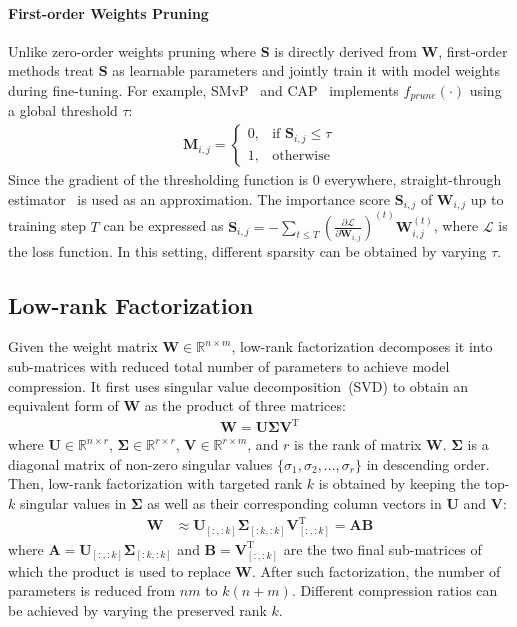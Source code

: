 \paragraph{First-order Weights Pruning} Unlike zero-order weights pruning where $\bm{S}$ is directly derived from $\bm{W}$, first-order methods treat 
$\bm{S}$ as learnable parameters and jointly train it with model weights 
during fine-tuning. For example, SMvP~\cite{movement} and CAP~\cite{cap}
implements $f_{prune}(\cdot)$ using a global threshold $\tau$:
\begin{align}
	\bm{M}_{i,j}=
	\begin{cases} 
		0, & \text{if }\bm{S}_{i,j}\le \tau\\
		1,  & \text{otherwise}  
	\end{cases}
	\label{eq:first}
\end{align}
Since the gradient of the thresholding function is 0 everywhere, straight-through estimator~\cite{st} is used as an approximation. The importance score $\bm{S}_{i,j}$ of $\bm{W}_{i,j}$ up to training step $T$ can be expressed as $\bm{S}_{i,j}=-\sum_{t\le T}(\frac{\partial \mathcal{L}}{\partial \bm{W}_{i,j}})^{(t)} \bm{W}_{i,j}^{(t)}$, where $\mathcal{L}$ is the loss function.
In this setting, different sparsity can be obtained by varying $\tau$.


\subsection{Low-rank Factorization}
\label{sec:lr}
Given the weight matrix $\bm{W}\in \mathbb{R}^{n\times m}$, low-rank factorization decomposes it into sub-matrices with reduced total number of
parameters to achieve model compression.  
It first uses singular value decomposition~(SVD) to obtain an equivalent 
form of $\bm{W}$ as the product of three matrices:
\begin{align}
	\bm{W}=\bm{U}\bm{\Sigma}\bm{V}^\mathrm{T}
\end{align}
where $\bm{U}\in \mathbb{R}^{n\times r}$, $\bm{\Sigma}\in  \mathbb{R}^{r\times r}$, $\bm{V}\in \mathbb{R}^{r\times m}$, and $r$ is the rank of matrix $\bm{W}$. $\bm{\Sigma}$ is a diagonal matrix of non-zero singular values $\{\sigma_1, \sigma_2,...,\sigma_r\}$ in descending order. Then, low-rank factorization with targeted rank $k$ is obtained by keeping the top-$k$ singular values in $\bm{\Sigma}$ as well as their corresponding column vectors in $\bm{U}$ and $\bm{V}$:
\begin{align}
	\bm{W}&\approx \bm{U}_{[:, :k]}\bm{\Sigma}_{[:k,:k]}\bm{V}_{[:, :k]}^{\mathrm{T}} =\bm{A}\bm{B}
	\label{eq:svd}
\end{align}
where $\bm{A}=\bm{U}_{[:,:k]}\bm{\Sigma}_{[:k,:k]}$ and $\bm{B}=\bm{V}_{[:,:k]}^{\mathrm{T}}$ are the two final sub-matrices of which the product is used to replace $\bm{W}$. After such factorization, the number of parameters is reduced from $nm$ to $k(n+m)$. Different compression ratios can be achieved by varying the preserved rank $k$.


